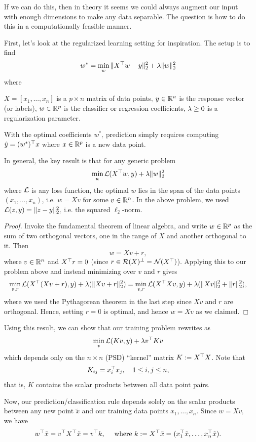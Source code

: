 \documentclass[11 pt]{scrartcl}
\newcommand{\tx}{\tilde{x}}
\begin{document}
If we can do this, then in theory it seems we could always augment our input with enough dimensions to make any data separable. 
The question is how to do this in a computationally feasible manner. 

First, let's look at the regularized learning setting for inspiration.  
The setup is to find
\[ w^* = \min_w \|X^\top w - y\|^2_2 + \lambda \|w\|^2_2\] 
where 
\begin{itemize}
    \ii $X = [x_1, \dots, x_n]$ is a $p\times n$ matrix of data points,
    \ii $y\in \mathbb R^n$ is the response vector (or labels), 
    \ii $w\in \mathbb R^p$ is the classifier or regression coefficients, 
    \ii $\lambda\geq 0$ is a regularization parameter. 
\end{itemize}

With the optimal coefficients $w^*$, prediction simply requires computing $\hat{y} = (w^*)^\top x$ where $x\in \mathbb R^p$ is a new data point. 

In general, the key result is that for any generic problem 
\[ \min_w \mathcal L(X^\top w, y) + \lambda \|w\|_2^2\] 
where $\mathcal L$ is any loss function, the optimal $w$ lies in the span of the data points $(x_1,\dots, x_n)$, i.e. $w = Xv$ for some $v\in\mathbb R^n$. 
In the above problem, we used $\mathcal L(z,y) = \|z-y\|^2_2$, i.e. the squared $\ell_2$-norm. 
\begin{proof}
    Invoke the fundamental theorem of linear algebra, and write $w\in \mathbb R^p$ as the sum of two orthogonal vectors, one in the range of $X$ and another orthogonal to it. 
    Then
    \[ w = Xv + r,\]
    where $v\in \mathbb R^n$ and $X^\top r = 0$ (since $r\in \mathcal R(X)^\perp = \mathcal N(X^\top)$).
    Applying this to our problem above and instead minimizing over $v$ and $r$ gives 
    \[ \min_{v,r} \mathcal L(X^\top (Xv+r), y) + \lambda (\|Xv+r\|_2^2) = \min_{v,r} \mathcal L(X^\top Xv, y) + \lambda (\|Xv\|^2_2+\|r\|_2^2) ,\] 
    where we used the Pythagorean theorem in the last step since $Xv$ and $r$ are orthogonal. 
    Hence, setting $r = 0$ is optimal, and hence $w = Xv$ as we claimed.
\end{proof}

Using this result, we can show that our training problem rewrites as 
\[ \min_v \mathcal L(Kv, y) + \lambda v^\top K v\]
which depends only on the $n\times n$ (PSD) ``kernel'' matrix $K := X^\top X$. 
Note that 
\[ K_{ij} = x_i^\top x_j, \quad 1\leq i,j\leq n,\] 
that is, $K$ contains the scalar products between all data point pairs. 

Now, our prediction/classification rule depends solely on the scalar products between any new point $\tilde{x}$ and our training data points $x_1, \dots, x_n$. 
Since $w = Xv$, we have
\[ w^\T \tilde{x} = v^\T X^\T \tilde{x} = v^\T k, \quad \text{ where } k := X^\T \tilde{x} = (x_1^\T \tilde{x},\dots, x_n^\T \tx).\]
\end{document}
